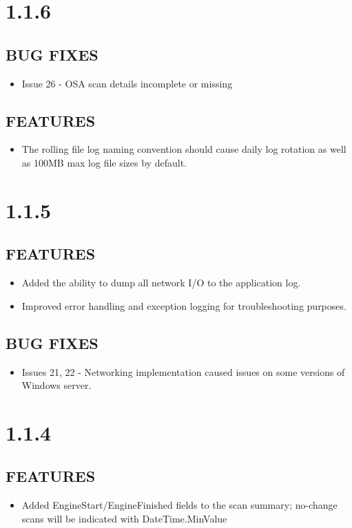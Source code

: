 \section{1.1.6}
\subsection*{BUG FIXES}
    \begin{itemize}
        \item Issue 26 - OSA scan details incomplete or missing
    \end{itemize}
\subsection*{FEATURES}
    \begin{itemize}
        \item The rolling file log naming convention should cause daily log rotation as well as 100MB max log file sizes by default.
    \end{itemize}

\section{1.1.5}
\subsection*{FEATURES}
    \begin{itemize}
        \item Added the ability to dump all network I/O to the application log.
        \item Improved error handling and exception logging for troubleshooting purposes.
    \end{itemize}
\subsection*{BUG FIXES}
    \begin{itemize}
        \item Issues 21, 22 - Networking implementation caused issues on some versions of Windows server.
    \end{itemize}


\section{1.1.4}
\subsection*{FEATURES}
    \begin{itemize}
        \item Added EngineStart/EngineFinished fields to the scan summary; no-change scans will be indicated with DateTime.MinValue
    \end{itemize}
